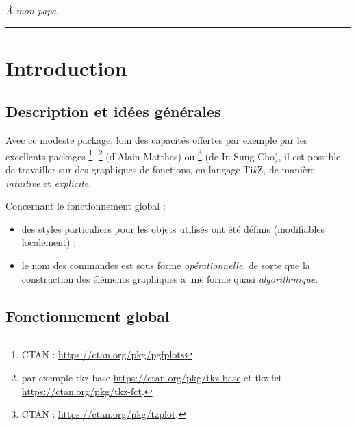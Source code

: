 \documentclass[11pt,a4paper]{ltxdoc}
\providecommand\tikzlogo{Ti\textit{k}Z}
\let\TikZ\tikzlogo
\begin{document}
\vfill

\hfill{\footnotesize\textit{\ttfamily À mon papa.}}

\vspace*{5mm}

\pagebreak


\hypertarget{matoc}{}

\tableofcontents

\vspace*{5mm}

\hrule

\vspace*{5mm}

\pagebreak

\section{Introduction}

\subsection{Description et idées générales}

Avec ce modeste package, loin des capacités offertes par exemple par les excellents packages \footnote{CTAN : \url{https://ctan.org/pkg/pgfplots}}, \footnote{par exemple tkz-base \url{https://ctan.org/pkg/tkz-base} et tkz-fct \url{https://ctan.org/pkg/tkz-fct}.} (d'Alain Matthes) ou \footnote{CTAN :  \url{https://ctan.org/pkg/tzplot}.} (de In-Sung Cho), il est possible de travailler sur des graphiques de fonctions, en langage \TikZ, de manière \textit{intuitive} et \textit{explicite}.

\smallskip

Concernant le fonctionnement global :

\smallskip

\begin{itemize}
	\item des styles particuliers pour les objets utilisés ont été définis (modifiables localement) ;
	\item le nom des commandes est sous forme \textit{opérationnelle}, de sorte que la construction des éléments graphiques a une forme quasi \textit{algorithmique}.
\end{itemize}

\subsection{Fonctionnement global}
\end{document}
